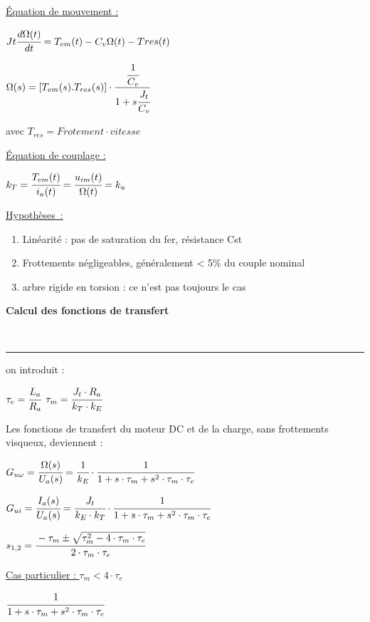 \documentclass[	DIV=calc,%
							paper=a4,%
							fontsize=10pt,%
							twocolumn]{scrartcl} %
\newcounter{mycounter}
\newcommand{\formdesc}[1]{\large\textbf{#1} \addtocounter{mycounter}{1} \hfill \themycounter \\ \vspace{-3mm} \hrule \vspace{2mm}}
\newcommand{\formtitle}[1]{\large\underline{#1}}
\begin{document}
\formtitle{Équation de mouvement :} 

{\hfill $Jt \cfrac{d\Omega(t)}{dt} = T_{em}(t) - C_v \Omega(t) - Tres(t) $\hfill}

{\hfill $\Omega(s) = [T_{em}(s).T_{res}(s)] \cdot \cfrac{ \cfrac{1}{C_v}}{1+s\cfrac{J_t}{C_v}}  $\hfill}

avec 
{\hfill $T_{res} = Frotement \cdot vitesse  $\hfill}

\formtitle{Équation de couplage : }

{\hfill $k_T = \cfrac{T_{em}(t)}{i_a(t)} = \cfrac{u_{im}(t)}{\Omega(t) }= k_u$\hfill}

\formtitle{Hypothèses :}
\begin{enumerate}
    \item Linéarité : pas de saturation du fer, résistance Cst
    \item Frottements négligeables, généralement < 5\% du couple nominal
    \item arbre rigide en torsion : ce n’est pas toujours le cas
\end{enumerate}

\newpage 

\formdesc{Calcul des fonctions de transfert}

on introduit :

$\tau_e = \cfrac{L_a}{R_a}$ \qquad $\tau_m = \cfrac{J_t\cdot R_a}{k_T\cdot k_E}$

Les fonctions de transfert du moteur DC et de la charge, sans frottements visqueux, deviennent :


{\hfill $G_{u\omega} = \cfrac{\Omega(s)}{U_a(s)} = \cfrac{1}{k_E}\cdot\cfrac{1}{1 + s \cdot \tau_m + s^2 \cdot \tau_m \cdot \tau_e} $\hfill}

\vspace{3mm}
{\hfill $G_{ui} = \cfrac{I_a(s)}{U_a(s)} = \cfrac{J_t}{k_E\cdot k_T}\cdot\cfrac{1}{1 + s \cdot \tau_m + s^2 \cdot \tau_m \cdot \tau_e} $\hfill}

\vspace{3mm}

{\hfill $s_{1,2} = \cfrac{-\tau_m \pm \sqrt{\tau_m^2 - 4 \cdot \tau_m \cdot \tau_e}}{2 \cdot \tau_m \cdot \tau_e} $\hfill}

\vspace{3mm}

\formtitle{Cas particulier : $\tau_m  < 4 \cdot\tau_e$}


{\hfill $ \cfrac{1}{1 + s \cdot \tau_m + s^2 \cdot \tau_m \cdot \tau_e}$\hfill}

\vspace{3mm}
\end{document}

